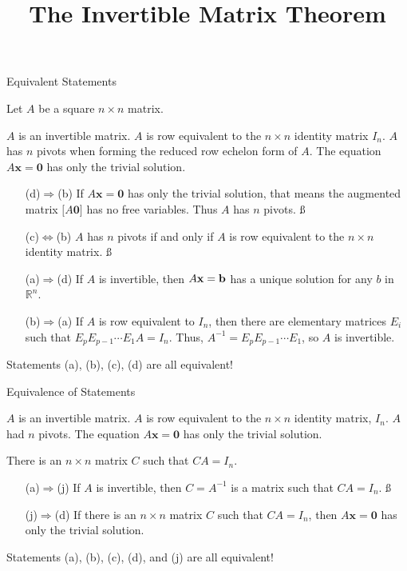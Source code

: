 \documentclass[xcolor=dvipsnames,aspectratio=169,t]{beamer}
\title{The Invertible Matrix Theorem}
\begin{document}
\maketitle

\begin{frame}{Equivalent Statements}

Let $A$ be a square $n \times n$ matrix. 

\bb[(a)]
\ii $A$ is an invertible matrix.
\ii $A$ is row equivalent to the $n \times n$ identity matrix $I_n$.
\ii $A$ has $n$ pivots when forming the reduced row echelon form of $A$.
\ii The equation $A \mathbf{x} = \mathbf{0}$ has only the trivial solution.
\ee
  \bigskip

  \pause
  \begingroup\addtolength{\leftmargini}{2em}
  \begin{itemize}
  \item[(d)$\Rightarrow$(b)] If $A \mathbf{x} = \mathbf{0}$ has only the trivial solution, that means the augmented matrix $\lbrack A \mathbf{0} \rbrack$ has no free variables. Thus $A$ has $n$ pivots. \ss
  \item[(c)$\Leftrightarrow$(b)] $A$ has $n$ pivots if and only if $A$ is row equivalent to the $n \times n$ identity matrix. \ss
  \pause
  \item[(a)$\Rightarrow$(d)] If $A$ is invertible, then $A\mathbf{x}=\mathbf{b}$ has a unique solution for any $b$ in $\mathbb{R}^n$.
  \item[(b)$\Rightarrow$(a)]
      If $A$ is row equivalent to $I_n$, then there are elementary matrices $E_i$ such that $E_p E_{p-1} \cdots E_1 A = I_n$.  Thus, $A^{-1} = E_p E_{p-1} \cdots E_1$, so $A$ is invertible.
  \end{itemize}
  \endgroup

  \pause
  \alert{Statements (a), (b), (c), (d) are all equivalent!}
\end{frame}

\begin{frame}{Equivalence of Statements}

  \bb[(a)]
  \ii $A$ is an invertible matrix.
  \ii $A$ is row equivalent to the $n \times n$ identity matrix, $I_n$.
  \ii $A$ had $n$ pivots.
  \ii The equation $A \mathbf{x} = \mathbf{0}$ has only the trivial solution.
  \addtocounter{enumi}{5}
  \ii There is an $n \times n$ matrix $C$ such that $CA = I_n$.
  \ee
  \bigskip

  \pause
  \begingroup\addtolength{\leftmargini}{2em}
  \begin{itemize}
    \item[(a)$\Rightarrow$(j)] If $A$ is invertible, then $C=A^{-1}$ is a matrix such that $CA = I_n$. \ss
    \item[(j)$\Rightarrow$(d)] If there is an $n \times n$ matrix $C$ such that $CA = I_n$, then $A \mathbf{x} = \mathbf{0}$ has only the trivial solution.
  \end{itemize}
  \endgroup
  \bigskip
  
  \pause
  \alert{Statements (a), (b), (c), (d), and (j) are all equivalent!}

\end{frame}
\end{document}
